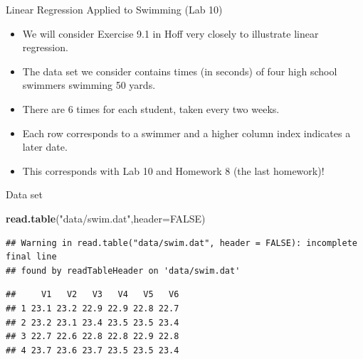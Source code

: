 \documentclass[
  ignorenonframetext,
]{beamer}
\newenvironment{Shaded}{\begin{snugshade}}{\end{snugshade}}
\newcommand{\DataTypeTok}[1]{\textcolor[rgb]{0.13,0.29,0.53}{#1}}
\newcommand{\KeywordTok}[1]{\textcolor[rgb]{0.13,0.29,0.53}{\textbf{#1}}}
\newcommand{\NormalTok}[1]{#1}
\newcommand{\OtherTok}[1]{\textcolor[rgb]{0.56,0.35,0.01}{#1}}
\newcommand{\StringTok}[1]{\textcolor[rgb]{0.31,0.60,0.02}{#1}}
\providecommand{\tightlist}{%
  \setlength{\itemsep}{0pt}\setlength{\parskip}{0pt}}
\begin{document}
\begin{frame}{Linear Regression Applied to Swimming (Lab 10)}
\protect\hypertarget{linear-regression-applied-to-swimming-lab-10}{}

\begin{itemize}
\tightlist
\item
  We will consider Exercise 9.1 in Hoff very closely to illustrate
  linear regression.
\item
  The data set we consider contains times (in seconds) of four high
  school swimmers swimming 50 yards.
\item
  There are 6 times for each student, taken every two weeks.
\item
  Each row corresponds to a swimmer and a higher column index indicates
  a later date.
\item
  This corresponds with Lab 10 and Homework 8 (the last homework)!
\end{itemize}

\end{frame}

\begin{frame}[fragile]{Data set}
\protect\hypertarget{data-set}{}

\begin{Shaded}
\begin{Highlighting}[]
\KeywordTok{read.table}\NormalTok{(}\StringTok{"data/swim.dat"}\NormalTok{,}\DataTypeTok{header=}\OtherTok{FALSE}\NormalTok{)}
\end{Highlighting}
\end{Shaded}

\begin{verbatim}
## Warning in read.table("data/swim.dat", header = FALSE): incomplete final line
## found by readTableHeader on 'data/swim.dat'
\end{verbatim}

\begin{verbatim}
##     V1   V2   V3   V4   V5   V6
## 1 23.1 23.2 22.9 22.9 22.8 22.7
## 2 23.2 23.1 23.4 23.5 23.5 23.4
## 3 22.7 22.6 22.8 22.8 22.9 22.8
## 4 23.7 23.6 23.7 23.5 23.5 23.4
\end{verbatim}

\end{frame}
\end{document}
